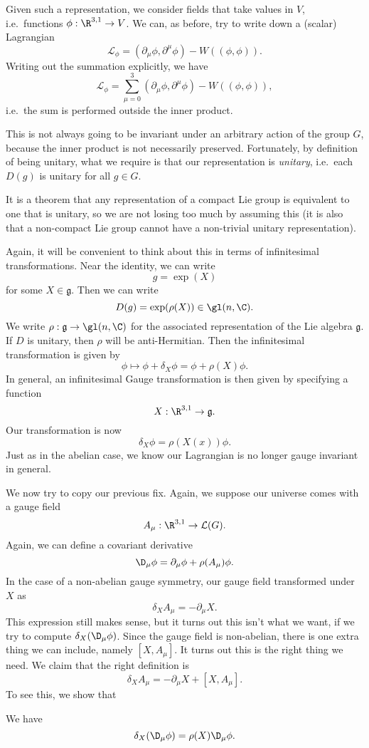 \documentclass[a4paper]{article}
\begin{document}
Given such a representation, we consider fields that take values in $V$, i.e.\ functions $\phi: \R^{3, 1} \to V$. We can, as before, try to write down a (scalar) Lagrangian
\[
  \mathcal{L}_\phi = (\partial_\mu \phi, \partial^\mu \phi) - W((\phi, \phi)).
\]
Writing out the summation explicitly, we have
\[
  \mathcal{L}_\phi = \sum_{\mu = 0}^3 (\partial_\mu \phi, \partial^\mu \phi) - W((\phi, \phi)),
\]
i.e.\ the sum is performed outside the inner product.

This is not always going to be invariant under an arbitrary action of the group $G$, because the inner product is not necessarily preserved. Fortunately, by definition of being unitary, what we require is that our representation is \emph{unitary}, i.e.\ each $D(g)$ is unitary for all $g \in G$.

It is a theorem that any representation of a compact Lie group is equivalent to one that is unitary, so we are not losing too much by assuming this (it is also that a non-compact Lie group cannot have a non-trivial unitary representation).

Again, it will be convenient to think about this in terms of infinitesimal transformations. Near the identity, we can write
\[
  g = \exp(X)
\]
for some $X \in \mathfrak{g}$. Then we can write
\[
  D(g) = \exp(\rho(X)) \in \gl(n, \C).
\]
We write $\rho: \mathfrak{g} \to \gl(n, \C)$ for the associated representation of the Lie algebra $\mathfrak{g}$. If $D$ is unitary, then $\rho$ will be anti-Hermitian. Then the infinitesimal transformation is given by
\[
  \phi \mapsto \phi + \delta_X \phi = \phi + \rho(X) \phi.
\]
In general, an infinitesimal Gauge transformation is then given by specifying a function
\[
  X: \R^{3, 1} \to \mathfrak{g}.
\]
Our transformation is now
\[
  \delta_X \phi = \rho(X(x))\phi.
\]
Just as in the abelian case, we know our Lagrangian is no longer gauge invariant in general.

We now try to copy our previous fix. Again, we suppose our universe comes with a gauge field
\[
  A_\mu : \R^{3, 1} \to \mathcal{L}(G).
\]
Again, we can define a covariant derivative
\[
  \D_\mu \phi = \partial_\mu \phi + \rho(A_\mu) \phi.
\]
In the case of a non-abelian gauge symmetry, our gauge field transformed under $X$ as
\[
  \delta_X A_\mu = - \partial_\mu X.
\]
This expression still makes sense, but it turns out this isn't what we want, if we try to compute $\delta_X(\D_\mu \phi)$. Since the gauge field is non-abelian, there is one extra thing we can include, namely $[X, A_\mu]$. It turns out this is the right thing we need. We claim that the right definition is
\[
  \delta_X A_\mu = - \partial_\mu X + [X, A_\mu].
\]
To see this, we show that
\begin{prop}
  We have
  \[
    \delta_X (\D_\mu \phi) = \rho(X) \D_\mu \phi.
  \]
\end{prop}
\end{document}
